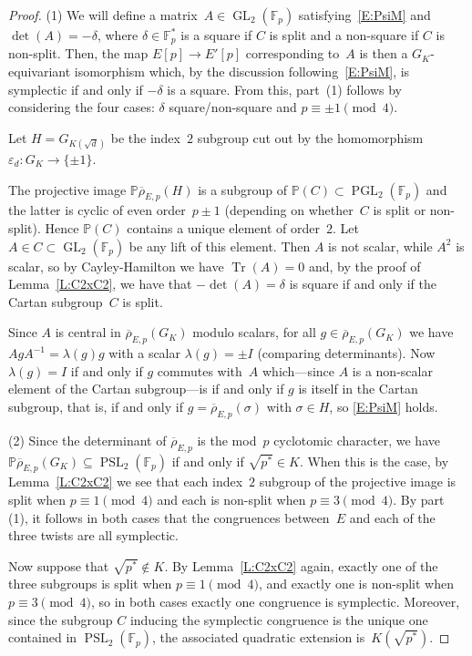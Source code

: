 \documentclass[twoside,leqno,symbols-for-thanks, draft]{rmi}
\numberwithin{equation}{section}
\newcommand{\Fp}{\mathbb{F}_p}
\newcommand{\Fpstar}{\mathbb{F}_p^*}
\newcommand{\PP}{\mathbb{P}}
\newcommand{\rhobar}{{\overline{\rho}}}
\DeclareMathOperator{\Tr}{Tr}
\newcommand{\GL}{\operatorname{GL}}
\newcommand{\PGL}{\operatorname{PGL}}
\newcommand{\PSL}{\operatorname{PSL}}
\theoremstyle{remark}
\begin{document}
\begin{proof} 
(1) We will define a matrix~$A\in\GL_2(\Fp)$ satisfying~\eqref{E:PsiM}
and $\det(A)=-\delta$,
where $\delta \in \Fpstar$ is a square if $C$ is split and a non-square
if $C$ is non-split.   
Then, the map $E[p]\to E'[p]$ corresponding to~$A$
is then a
$G_K$-equivariant isomorphism which, 
by the discussion following~\eqref{E:PsiM}, 
is symplectic if and only if
$-\delta$ is a square.  From this, 
part~(1) follows by considering the four cases:
$\delta$ square/non-square and $p\equiv\pm1\pmod4$.


Let $H=G_{K(\sqrt{d})}$ be the index~$2$ subgroup cut out by 
the homomorphism~$\varepsilon_d:G_K\to\{\pm 1 \}$.

The projective image $\PP \rhobar_{E,p}(H)$ is a subgroup of $\PP(C)
\subset \PGL_2(\Fp)$ and the latter is cyclic of even order~$p\pm1$
(depending on whether~$C$ is split or non-split). Hence $\PP(C)$
contains a unique element of order~$2$.  Let $A \in C \subset
\GL_2(\Fp)$ be any lift of this element.  Then $A$ is not scalar,
while $A^2$ is scalar, so by Cayley-Hamilton we have $\Tr(A)=0$ and,
by the proof of Lemma~\ref{L:C2xC2}, we have that $-\det(A) = \delta$
is square if and only if the Cartan subgroup~$C$ is split.

Since $A$ is central in $\rhobar_{E,p}(G_K)$ modulo scalars, for all
$g\in\rhobar_{E,p}(G_K)$ we have $AgA^{-1}=\lambda(g)g$ with a scalar
$\lambda(g)=\pm I$ (comparing determinants).  Now $\lambda(g)=I$ if and
only if $g$ commutes with~$A$ which---since $A$ is a non-scalar element
of the Cartan subgroup---is if and only if $g$ is itself in the Cartan
subgroup, that is, if and only if $g=\rhobar_{E,p}(\sigma)$ with
$\sigma\in H$, so  \eqref{E:PsiM} holds.


(2) Since the determinant of $\rhobar_{E,p}$ is the mod~$p$ cyclotomic
character, we have $\PP\rhobar_{E,p}(G_K)\subseteq \PSL_2(\Fp)$ if
and only if $\sqrt{p^*}\in K$.  When this is the case, by
Lemma~\ref{L:C2xC2} we see that each index~$2$ subgroup of the
projective image is split when $p\equiv1\pmod4$ and each is non-split
when $p\equiv3\pmod4$.  By part (1), it follows in both cases that the
congruences between~$E$ and each of the three twists are all
symplectic.

Now suppose that $\sqrt{p^*}\notin K$.  By Lemma~\ref{L:C2xC2} again,
exactly one of the three subgroups is split when $p\equiv1\pmod4$, and
exactly one is non-split when $p\equiv3\pmod4$, so in both cases
exactly one congruence is symplectic.  Moreover, since the subgroup
$C$ inducing the symplectic congruence is the unique one contained in
$\PSL_2(\Fp)$, the associated quadratic extension is~$K(\sqrt{p^*})$.
\end{proof}
\end{document}
